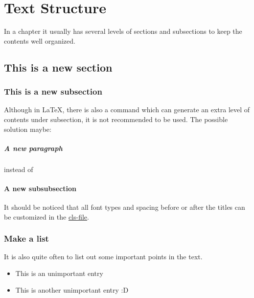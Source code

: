 \chapter{Text Structure}

\graphicspath{ {graphics/Chapter3/} }

In a chapter it usually has several levels of sections and subsections to keep the contents well organized. 

\section{This is a new section}

	\subsection{This is a new subsection}
	
		Although in \LaTeX, there is also a {\color{blue}{\verb|\subsubsection|}} command which can generate an extra level of contents under subsection, it is not recommended to be used. The possible solution maybe:
		
		\paragraph{\colorbox{yellow!50}{A new paragraph}}
		
		instead of 
		
		\subsubsection{\colorbox{yellow!50}{A new subsubsection}}
		
		It should be noticed that all font types and spacing before or after the titles can be customized in the \href{thesis-template.cls}{cls-file}.
		
	\subsection{Make a list}
		
		It is also quite often to list out some important points in the text.
		
		\begin{itemize}
			\item This is an unimportant entry
			\item This is another unimportant entry :D
		\end{itemize}